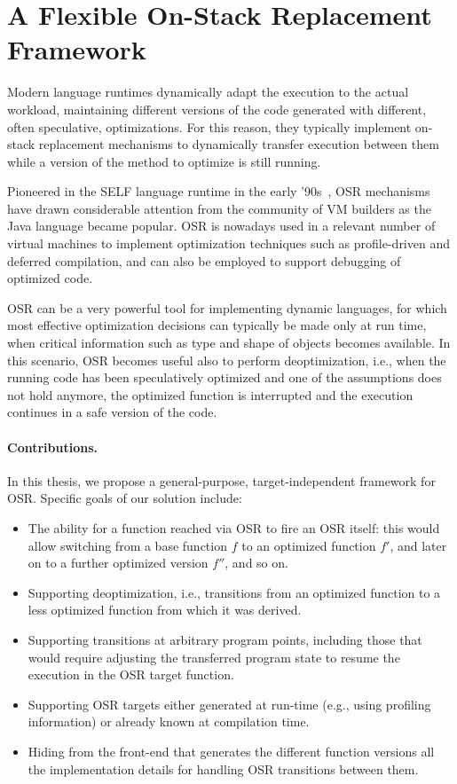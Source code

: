 \section{A Flexible On-Stack Replacement Framework}

Modern language runtimes dynamically adapt the execution to the actual workload, maintaining different versions of the code generated with different, often speculative, optimizations. For this reason, they typically implement on-stack replacement mechanisms to dynamically transfer execution between them while a version of the method to optimize is still running.

Pioneered in the SELF language runtime in the early '90s~\cite{Holzle92}, OSR mechanisms have drawn considerable attention from the community of VM builders as the Java language became popular. OSR is nowadays used in a relevant number of virtual machines to implement optimization techniques such as profile-driven and deferred compilation, and can also be employed to support debugging of optimized code.

\noindent OSR can be a very powerful tool for implementing dynamic languages, for which most effective optimization decisions can typically be made only at run time, when critical information such as type and shape of objects becomes available. In this scenario, OSR becomes useful also to perform deoptimization, i.e., when the running code has been speculatively optimized and one of the assumptions does not hold anymore, the optimized function is interrupted and the execution continues in a safe version of the code.

\paragraph*{Contributions.} In this thesis, we propose a general-purpose, target-independent framework for OSR. Specific goals of our solution include:
\begin{itemize}[parsep=0pt]
\item The ability for a function reached via OSR to fire an OSR itself: this would allow switching from a base function $f$ to an optimized function $f'$, and later on to a further optimized version $f''$, and so on.
\item Supporting deoptimization, i.e., transitions from an optimized function to a less optimized function from which it was derived.
\item Supporting transitions at arbitrary program points, including those that would require adjusting the transferred program state to resume the execution in the OSR target function.
\item Supporting OSR targets either generated at run-time (e.g., using profiling information) or already known at compilation time.
\item Hiding from the front-end that generates the different function versions all the implementation details for handling OSR transitions between them.%
\end{itemize}

